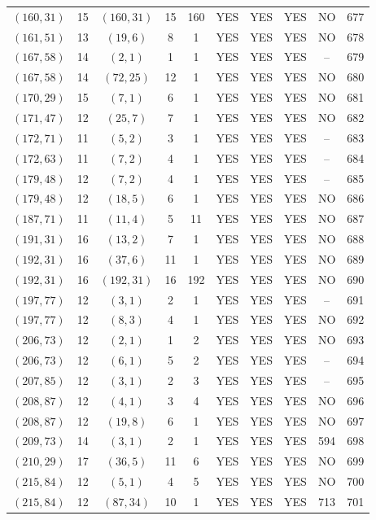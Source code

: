 \begin{longtable}{|c|c|c|c|c|c|c|c|c|c|}
$(160, 31)$ & 15 & $(160, 31)$ & 15 & 160 & YES & YES & YES & NO & 677\\
$(161, 51)$ & 13 & $(19, 6)$ & 8 & 1 & YES & YES & YES & NO & 678\\
$(167, 58)$ & 14 & $(2, 1)$ & 1 & 1 & YES & YES & YES & -- & 679\\
$(167, 58)$ & 14 & $(72, 25)$ & 12 & 1 & YES & YES & YES & NO & 680\\
$(170, 29)$ & 15 & $(7, 1)$ & 6 & 1 & YES & YES & YES & NO & 681\\
$(171, 47)$ & 12 & $(25, 7)$ & 7 & 1 & YES & YES & YES & NO & 682\\
$(172, 71)$ & 11 & $(5, 2)$ & 3 & 1 & YES & YES & YES & -- & 683\\
$(172, 63)$ & 11 & $(7, 2)$ & 4 & 1 & YES & YES & YES & -- & 684\\
$(179, 48)$ & 12 & $(7, 2)$ & 4 & 1 & YES & YES & YES & -- & 685\\
$(179, 48)$ & 12 & $(18, 5)$ & 6 & 1 & YES & YES & YES & NO & 686\\
$(187, 71)$ & 11 & $(11, 4)$ & 5 & 11 & YES & YES & YES & NO & 687\\
$(191, 31)$ & 16 & $(13, 2)$ & 7 & 1 & YES & YES & YES & NO & 688\\
$(192, 31)$ & 16 & $(37, 6)$ & 11 & 1 & YES & YES & YES & NO & 689\\
$(192, 31)$ & 16 & $(192, 31)$ & 16 & 192 & YES & YES & YES & NO & 690\\
$(197, 77)$ & 12 & $(3, 1)$ & 2 & 1 & YES & YES & YES & -- & 691\\
$(197, 77)$ & 12 & $(8, 3)$ & 4 & 1 & YES & YES & YES & NO & 692\\
$(206, 73)$ & 12 & $(2, 1)$ & 1 & 2 & YES & YES & YES & NO & 693\\
$(206, 73)$ & 12 & $(6, 1)$ & 5 & 2 & YES & YES & YES & -- & 694\\
$(207, 85)$ & 12 & $(3, 1)$ & 2 & 3 & YES & YES & YES & -- & 695\\
$(208, 87)$ & 12 & $(4, 1)$ & 3 & 4 & YES & YES & YES & NO & 696\\
$(208, 87)$ & 12 & $(19, 8)$ & 6 & 1 & YES & YES & YES & NO & 697\\
$(209, 73)$ & 14 & $(3, 1)$ & 2 & 1 & YES & YES & YES & 594 & 698\\
$(210, 29)$ & 17 & $(36, 5)$ & 11 & 6 & YES & YES & YES & NO & 699\\
$(215, 84)$ & 12 & $(5, 1)$ & 4 & 5 & YES & YES & YES & NO & 700\\
$(215, 84)$ & 12 & $(87, 34)$ & 10 & 1 & YES & YES & YES & 713 & 701\\

\end{longtable}
